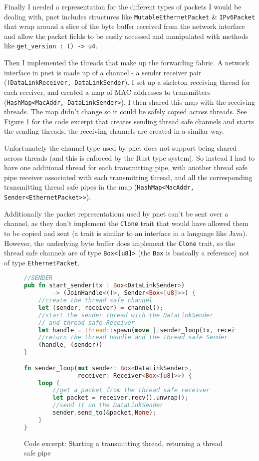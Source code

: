 \documentclass[12pt,a4paper,twoside,openany]{report}
\begin{document}
Finally I needed a representation for the different types of packets I would be dealing with, pnet\cite{pnet_rust} includes structures like \verb!MutableEthernetPacket! \& \verb!IPv6Packet! that wrap around a slice of the byte buffer received from the network interface and allow the packet fields to be easily accessed and manipulated with methods like \verb!get_version : () -> u4!.

\bigskip

Then I implemented the threads that make up the forwarding fabric.  A network interface in pnet is made up of a channel - a sender receiver pair (\verb!(DataLinkReceiver, DataLinkSender!). I set up a skeleton receiving thread for each receiver, and created a map of MAC addresses to transmitters (\verb!HashMap<MacAddr, DataLinkSender>!).  I then shared this map with the receiving threads. The map didn't change so it could be safely copied across threads. See \hyperref[fig::sending]{Figure }\ref{fig::sending} for the code excerpt that creates sending thread safe channels and starts the sending threads, the receiving channels are created in a similar way.

Unfortunately the channel type used by pnet does not support being shared across threads (and this is enforced by the Rust type system).  So instead I had to have one additional thread for each transmitting pipe, with another thread safe pipe receiver associated with each transmitting thread, and all the corresponding transmitting thread safe pipes in the map (\verb!HashMap<MacAddr, Sender<EthernetPacket>>!).

Additionally the packet representations used by pnet can't be sent over a channel, as they don't implement the \verb!Clone! trait that would have allowed them to be copied and sent (a trait is similar to an interface in a language like Java).  However, the underlying byte buffer does implement the \verb!Clone! trait, so the thread safe channels are of type \verb!Box<[u8]>! (the \verb!Box! is basically a reference) not of type \verb!EthernetPacket!. 

\begin{figure}
\centering
\begin{varwidth}{\linewidth}
\begin{lstlisting}[language=Rust]
//SENDER
pub fn start_sender(tx : Box<DataLinkSender>) 
 		-> (JoinHandle<()>, Sender<Box<[u8]>>) {
    //create the thread safe channel
    let (sender, receiver) = channel();
    //start the sender thread with the DataLinkSender 
    // and thread safe Receiver
    let handle = thread::spawn(move ||sender_loop(tx, receiver));
    //return the thread handle and the thread safe Sender
    (handle, (sender))
}

fn sender_loop(mut sender: Box<DataLinkSender>, 
			   receiver: Receiver<Box<[u8]>>) {
    loop {
    	//get a packet from the thread safe receiver
        let packet = receiver.recv().unwrap();
        //send it on the DataLinkSender
        sender.send_to(&packet,None);
    }
}
\end{lstlisting}
\end{varwidth}
\caption{Code excerpt: Starting a transmitting thread, returning a thread safe pipe}
\label{fig::sending}
\end{figure}
\end{document}
